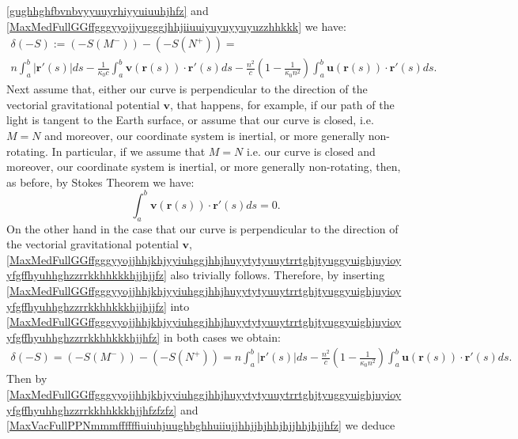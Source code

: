 \documentclass{article}
\theoremstyle{definition}
\theoremstyle{remark}
\renewcommand{\vec}[1]{\mathbf{#1}}
\newcommand{\er}{\eqref}
\newcommand{\er}{\eqref}
\begin{document}
\er{gughhghfbvnbvyyuuyrhiyyuiuuhjhfz} and
\er{MaxMedFullGGffgggyyojjyugggjhhjiiuuiyuyuyyuyuzzhhkkk} we have:
\begin{multline}\label{MaxMedFullGGffgggyyojjhhjkhjyyiuhggjhhjhuyytytyuuytrrtghjtyuggyuighjuyioyyfgffhyuhhghzzrrkkhhkkkhjjhfz}
\delta(-S):=\left(-S(M^-)\right)- \left(-S(N^+)\right)=\\
n\int_a^b \left|\vec r'(s)\right|ds-\frac{1}{\kappa_0 c}\int_a^b\vec
v\left(\vec r(s)\right)\cdot\vec
r'(s)ds-\frac{n^2}{c}\left(1-\frac{1}{\kappa_0n^2}\right)\int_a^b\vec
u\left(\vec r(s)\right)\cdot\vec r'(s)ds.
\end{multline}
Next assume that, either our curve is perpendicular to the direction
of the vectorial gravitational potential $\vec v$, that happens, for
example, if our path of the light is tangent to the Earth surface,
or assume that our curve is closed, i.e. $M=N$ and moreover, our
coordinate system is inertial, or more generally non-rotating. In
particular, if we assume that $M=N$ i.e. our curve is closed and
moreover, our coordinate system is inertial, or more generally
non-rotating, then, as before, by Stokes Theorem we have:
\begin{equation}\label{MaxMedFullGGffgggyyojjhhjkhjyyiuhggjhhjhuyytytyuuytrrtghjtyuggyuighjuyioyyfgffhyuhhghzzrrkkhhkkkhjjhjjfz}
\int_a^b\vec v\left(\vec r(s)\right)\cdot\vec r'(s)ds=0.
\end{equation}
On the other hand in the case that our curve is perpendicular to the
direction of the vectorial gravitational potential $\vec v$,
\er{MaxMedFullGGffgggyyojjhhjkhjyyiuhggjhhjhuyytytyuuytrrtghjtyuggyuighjuyioyyfgffhyuhhghzzrrkkhhkkkhjjhjjfz}
also trivially follows. Therefore, by inserting
\er{MaxMedFullGGffgggyyojjhhjkhjyyiuhggjhhjhuyytytyuuytrrtghjtyuggyuighjuyioyyfgffhyuhhghzzrrkkhhkkkhjjhjjfz}
into
\er{MaxMedFullGGffgggyyojjhhjkhjyyiuhggjhhjhuyytytyuuytrrtghjtyuggyuighjuyioyyfgffhyuhhghzzrrkkhhkkkhjjhfz}
in both cases we obtain:
\begin{multline}\label{MaxMedFullGGffgggyyojjhhjkhjyyiuhggjhhjhuyytytyuuytrrtghjtyuggyuighjuyioyyfgffhyuhhghzzrrkkhhkkkhjjhfzfzfz}
\delta(-S)=\left(-S(M^-)\right)- \left(-S(N^+)\right)= n\int_a^b
\left|\vec
r'(s)\right|ds-\frac{n^2}{c}\left(1-\frac{1}{\kappa_0n^2}\right)\int_a^b\vec
u\left(\vec r(s)\right)\cdot\vec r'(s)ds.
\end{multline}
Then by
\er{MaxMedFullGGffgggyyojjhhjkhjyyiuhggjhhjhuyytytyuuytrrtghjtyuggyuighjuyioyyfgffhyuhhghzzrrkkhhkkkhjjhfzfzfz}
and
\er{MaxVacFullPPNmmmffffffiuiuhjuughbghhuiiujjhhjjhjhhjhjjhhjhjjhfz}
we deduce
\end{document}
